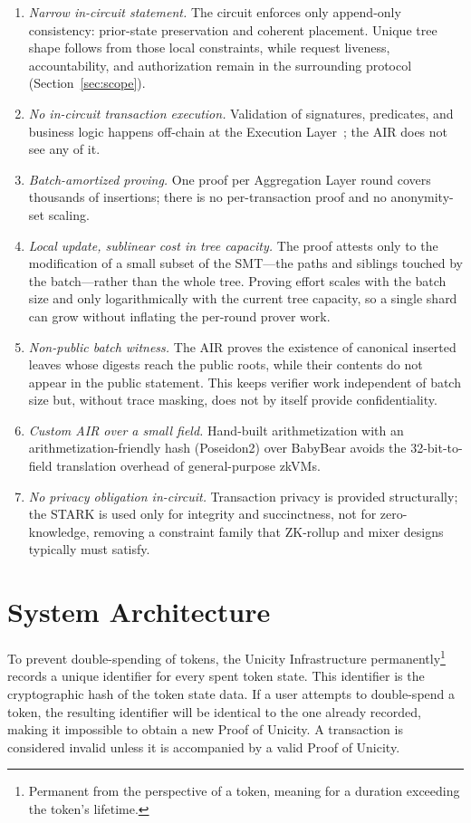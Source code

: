 \documentclass[11pt]{article}
\begin{document}
\begin{enumerate}[nosep]
    \item \emph{Narrow in-circuit statement.} The circuit enforces only append-only consistency: prior-state preservation and coherent placement. Unique tree shape follows from those local constraints, while request liveness, accountability, and authorization remain in the surrounding protocol (Section~\ref{sec:scope}).
    \item \emph{No in-circuit transaction execution.} Validation of signatures, predicates, and business logic happens off-chain at the Execution Layer~\cite{exemodel}; the AIR does not see any of it.
    \item \emph{Batch-amortized proving.} One proof per Aggregation Layer round covers thousands of insertions; there is no per-transaction proof and no anonymity-set scaling.
    \item \emph{Local update, sublinear cost in tree capacity.} The proof attests only to the modification of a small subset of the SMT---the paths and siblings touched by the batch---rather than the whole tree. Proving effort scales with the batch size and only logarithmically with the current tree capacity, so a single shard can grow without inflating the per-round prover work.
    \item \emph{Non-public batch witness.} The AIR proves the existence of canonical inserted leaves whose digests reach the public roots, while their contents do not appear in the public statement. This keeps verifier work independent of batch size but, without trace masking, does not by itself provide confidentiality.
    \item \emph{Custom AIR over a small field.} Hand-built arithmetization with an arithmetization-friendly hash (Poseidon2) over BabyBear avoids the 32-bit-to-field translation overhead of general-purpose zkVMs.
    \item \emph{No privacy obligation in-circuit.} Transaction privacy is provided structurally; the STARK is used only for integrity and succinctness, not for zero-knowledge, removing a constraint family that ZK-rollup and mixer designs typically must satisfy.
\end{enumerate}


\section{System Architecture}

To prevent double-spending of tokens, the Unicity Infrastructure permanently\footnote{Permanent from the perspective of a token, meaning for a duration exceeding the token's lifetime.} records a unique identifier for every spent token state. This identifier is the cryptographic hash of the token state data. If a user attempts to double-spend a token, the resulting identifier will be identical to the one already recorded, making it impossible to obtain a new Proof of Unicity. A transaction is considered invalid unless it is accompanied by a valid Proof of Unicity.
\end{document}
